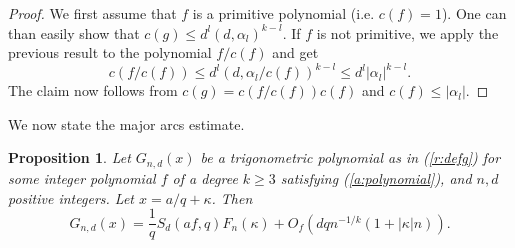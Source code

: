 \documentclass{amsart}
\newtheorem {proposition}{Proposition}
\numberwithin {equation}{section}
\begin{document}
\begin{proof}
We first assume that $f$ is a primitive polynomial (i.e. $c(f)=1$). One can
than easily show that $c(g)\leq d^{l}(d,\alpha _{l})^{k-l}.$ If $f$ is not
primitive, we apply the previous result to the polynomial $f/c(f)$ and get 
\begin{equation*}
c(f/c(f))\leq d^{l}(d,\alpha _{l}/c(f))^{k-l}\leq d^{l}|\alpha _{l}|^{k-l}.
\end{equation*}The claim now follows from $c(g)=c(f/c(f))c(f)$ and $c(f)\leq |\alpha _{l}|$.
\end{proof}

We now state the major arcs estimate.

\begin{proposition}
Let $G_{n,d}(x)$ be a trigonometric polynomial as in (\ref{r:defg}) for some
integer polynomial $f$ of a degree $k\geq 3$ satisfying (\ref{a:polynomial}), and $n,d$ positive integers. Let $x=a/q+\kappa $. Then 
\begin{equation*}
G_{n,d}(x)=\frac{1}{q}S_{d}(af,q)F_{n}(\kappa )+O_{f}(dqn^{-1/k}(1+|\kappa
|n)){\text{.}}
\end{equation*}
\end{proposition}
\end{document}
